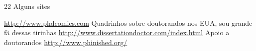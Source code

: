 22	Alguns sites

\begin{outline}
\1	\url{http://www.phdcomics.com}
\2	Quadrinhos sobre doutorandos nos EUA, sou grande fã dessas tirinhas
\1	\url{http://www.dissertationdoctor.com/index.html}
\2	Apoio a doutorandos
\1	\url{http://www.phinished.org/}
\end{outline}

